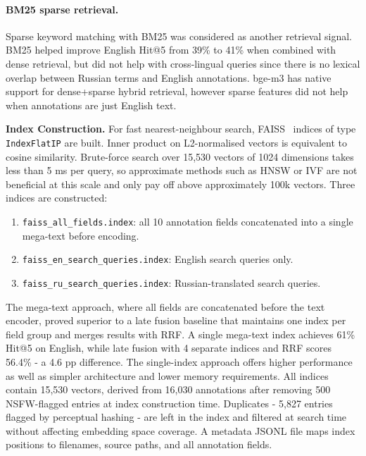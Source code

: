 \documentclass[a4paper,12pt]{article}
\begin{document}
\paragraph{BM25 sparse retrieval.} Sparse keyword matching with BM25 was considered as another retrieval signal. BM25 helped improve English Hit@5 from 39\% to 41\% when combined with dense retrieval, but did not help with cross-lingual queries since there is no lexical overlap between Russian terms and English annotations. bge-m3 has native support for dense+sparse hybrid retrieval, however sparse features did not help when annotations are just English text.

\textbf{Index Construction.} For fast nearest-neighbour search, FAISS~\cite{douze2024faiss} indices of type \texttt{IndexFlatIP} are built. Inner product on L2-normalised vectors is equivalent to cosine similarity. Brute-force search over 15,530 vectors of 1024 dimensions takes less than 5 ms per query, so approximate methods such as HNSW or IVF are not beneficial at this scale and only pay off above approximately 100k vectors. Three indices are constructed:

\begin{enumerate}
    \item \texttt{faiss\_all\_fields.index}: all 10 annotation fields concatenated into a single mega-text before encoding.
    \item \texttt{faiss\_en\_search\_queries.index}: English search queries only.
    \item \texttt{faiss\_ru\_search\_queries.index}: Russian-translated search queries.
\end{enumerate}

The mega-text approach, where all fields are concatenated before the text encoder, proved superior to a late fusion baseline that maintains one index per field group and merges results with RRF. A single mega-text index achieves 61\% Hit@5 on English, while late fusion with 4 separate indices and RRF scores 56.4\% - a 4.6 pp difference. The single-index approach offers higher performance as well as simpler architecture and lower memory requirements. All indices contain 15,530 vectors, derived from 16,030 annotations after removing 500 NSFW-flagged entries at index construction time. Duplicates - 5,827 entries flagged by perceptual hashing - are left in the index and filtered at search time without affecting embedding space coverage. A metadata JSONL file maps index positions to filenames, source paths, and all annotation fields.
\end{document}
